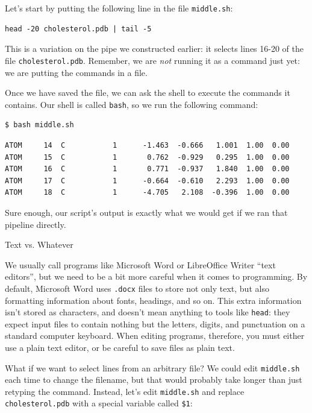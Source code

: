 \documentclass{book}
\begin{document}
Let's start by putting the following line in the file
\texttt{middle.sh}:

\begin{verbatim}
head -20 cholesterol.pdb | tail -5
\end{verbatim}

This is a variation on the pipe we constructed earlier: it selects lines
16-20 of the file \texttt{cholesterol.pdb}. Remember, we are \emph{not}
running it as a command just yet: we are putting the commands in a file.

Once we have saved the file, we can ask the shell to execute the
commands it contains. Our shell is called \texttt{bash}, so we run the
following command:

\begin{verbatim}
$ bash middle.sh
\end{verbatim}

\begin{verbatim}
ATOM     14  C           1      -1.463  -0.666   1.001  1.00  0.00
ATOM     15  C           1       0.762  -0.929   0.295  1.00  0.00
ATOM     16  C           1       0.771  -0.937   1.840  1.00  0.00
ATOM     17  C           1      -0.664  -0.610   2.293  1.00  0.00
ATOM     18  C           1      -4.705   2.108  -0.396  1.00  0.00
\end{verbatim}

Sure enough, our script's output is exactly what we would get if we ran
that pipeline directly.

\begin{swcbox}{Text vs. Whatever}

We usually call programs like Microsoft Word or LibreOffice Writer
``text editors'', but we need to be a bit more careful when it comes to
programming. By default, Microsoft Word uses \texttt{.docx} files to
store not only text, but also formatting information about fonts,
headings, and so on. This extra information isn't stored as characters,
and doesn't mean anything to tools like \texttt{head}: they expect input
files to contain nothing but the letters, digits, and punctuation on a
standard computer keyboard. When editing programs, therefore, you must
either use a plain text editor, or be careful to save files as plain
text.

\end{swcbox}

What if we want to select lines from an arbitrary file? We could edit
\texttt{middle.sh} each time to change the filename, but that would
probably take longer than just retyping the command. Instead, let's edit
\texttt{middle.sh} and replace \texttt{cholesterol.pdb} with a special
variable called \texttt{\$1}:
\end{document}

